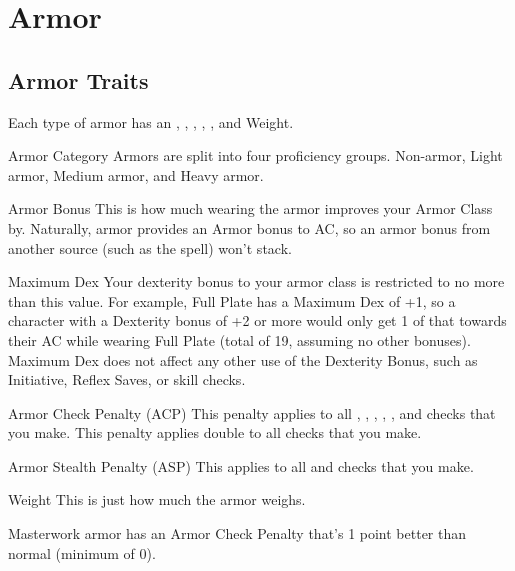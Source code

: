 \section{Armor}

\subsection{Armor Traits}

Each type of armor has an , , , , , and Weight.

\begin{description*}
\item[Armor Category] Armors are split into four proficiency groups. Non-armor, Light armor, Medium armor, and Heavy armor.
\item[Armor Bonus] This is how much wearing the armor improves your Armor Class by. Naturally, armor provides an Armor bonus to AC, so an armor bonus from another source (such as the  spell) won't stack.
\item[Maximum Dex] Your dexterity bonus to your armor class is restricted to no more than this value. For example, Full Plate has a Maximum Dex of +1, so a character with a Dexterity bonus of +2 or more would only get 1 of that towards their AC while wearing Full Plate (total of 19, assuming no other bonuses). Maximum Dex does not affect any other use of the Dexterity Bonus, such as Initiative, Reflex Saves, or skill checks.
\item[Armor Check Penalty (ACP)] This penalty applies to all , , , , , and  checks that you make. This penalty applies double to all  checks that you make.
\item[Armor Stealth Penalty (ASP)] This applies to all  and  checks that you make.
\item[Weight] This is just how much the armor weighs.
\end{description*}

Masterwork armor has an Armor Check Penalty that's 1 point better than normal (minimum of 0).

